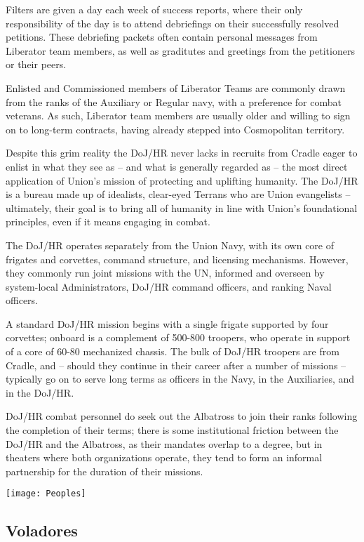Filters are given a day each week of success reports, where their only responsibility of the day is
to attend debriefings on their successfully resolved petitions. These debriefing packets often
contain personal messages from Liberator team members, as well as graditutes and greetings
from the petitioners or their peers.

Enlisted and Commissioned members of Liberator Teams are commonly drawn from the ranks of
the Auxiliary or Regular navy, with a preference for combat veterans. As such, Liberator team
members are usually older and willing to sign on to long-term contracts, having already stepped
into Cosmopolitan territory.

Despite this grim reality the DoJ/HR never lacks in recruits from Cradle eager to enlist in what
they see as -- and what is generally regarded as -- the most direct application of Union’s mission
of protecting and uplifting humanity. The DoJ/HR is a bureau made up of idealists, clear-eyed
Terrans who are Union evangelists -- ultimately, their goal is to bring all of humanity in line with
Union’s foundational principles, even if it means engaging in combat.

The DoJ/HR operates separately from the Union Navy, with its own core of frigates and corvettes,
command structure, and licensing mechanisms. However, they commonly run joint missions with
the UN, informed and overseen by system-local Administrators, DoJ/HR command officers, and
ranking Naval officers.

A standard DoJ/HR mission begins with a single frigate supported by four corvettes; onboard is a
complement of 500-800 troopers, who operate in support of a core of 60-80 mechanized chassis.
The bulk of DoJ/HR troopers are from Cradle, and -- should they continue in their career after a
number of missions -- typically go on to serve long terms as officers in the Navy, in the Auxiliaries,
and in the DoJ/HR.

DoJ/HR combat personnel do seek out the Albatross to join their ranks following the completion of
their terms; there is some institutional friction between the DoJ/HR and the Albatross, as their
mandates overlap to a degree, but in theaters where both organizations operate, they tend to form
an informal partnership for the duration of their missions.

\begin{center}
  \texttt{[image: Peoples]}
\end{center}
\subsection{Voladores}

